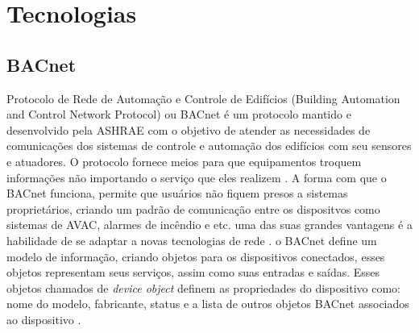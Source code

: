 \chapter{Tecnologias}

\section{BACnet}
Protocolo de Rede de Automação e Controle de Edifícios (Building Automation and Control Network Protocol) ou BACnet é um protocolo mantido e desenvolvido pela ASHRAE com o objetivo de atender as necessidades de comunicações dos sistemas de controle e automação dos edifícios com seu sensores e atuadores. O protocolo fornece meios para que equipamentos troquem informações não importando o serviço que eles realizem \cite{ASHRAE135}. A forma com que o BACnet funciona, permite que usuários não fiquem presos a sistemas proprietários, criando um padrão de comunicação entre os dispositvos como sistemas de AVAC, alarmes de incêndio e etc. uma das suas grandes vantagens é a habilidade de se adaptar a novas tecnologias de rede \cite{Bushby2002}.
o BACnet define um modelo de informação, criando objetos para os dispositivos conectados, esses objetos representam seus serviços, assim como suas entradas e saídas. Esses objetos chamados de \emph{device object} definem as propriedades do dispositivo como: nome do modelo, fabricante, status e a lista de outros objetos BACnet associados ao dispositivo \cite{Domingues2016}.

